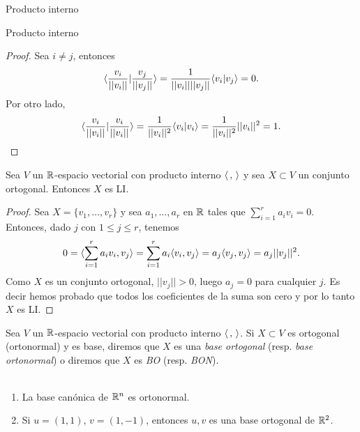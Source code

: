 \begin{chapter}{Producto interno}
\begin{section}{Producto interno}
\begin{proof}
            Sea $i \ne j$, entonces
            \begin{equation*}
            \langle \frac{v_i}{||v_i||} | \frac{v_j}{||v_j||}\rangle = \frac{1}{||v_i||||v_j||} \langle v_i | v_j\rangle = 0.
            \end{equation*}
            Por otro lado,
            \begin{equation*}
            \langle \frac{v_i}{||v_i||} | \frac{v_i}{||v_i||}\rangle = \frac{1}{||v_i||^2} \langle v_i | v_i\rangle=  \frac{1}{||v_i||^2}||v_i||^2 =1.
            \end{equation*}
        \end{proof}	
            
            
            
        
        
        \medskip
        
        \begin{teorema}\label{th-ortogonal-implica-li} Sea $V$  un $\mathbb R$-espacio vectorial con producto interno $\langle \,,\,\rangle$ y sea $X \subset V$ un conjunto  ortogonal. Entonces $X$ es LI. 
        \end{teorema}
        \begin{proof} Sea $X =\{v_1,\ldots,v_r \}$ y sea $a_1,\ldots,a_r$ en $\mathbb R$ tales que  $\sum_{i=1}^r a_iv_i =0$. Entonces,  dado $j$ con $1 \le j \le r$,  tenemos 
            $$
            0=\langle\sum_{i=1}^r a_iv_i ,v_j \rangle = \sum_{i=1}^r a_i\langle v_i ,v_j \rangle = a_j\langle v_j ,v_j \rangle = a_j||v_j||^2.
            $$
            Como $X$  es un conjunto ortogonal,  $||v_j|| >0$, luego $a_j =0$ para cualquier $j$. Es decir hemos probado que todos los coeficientes de la suma son cero y por lo tanto $X$  es LI.
        \end{proof}
        

        
        \begin{definicion} Sea $V$  un $\mathbb R$-espacio vectorial con producto interno $\langle \,,\,\rangle$. Si $X \subset V$ es ortogonal (ortonormal) y es base, diremos que $X$ es una \textit{base ortogonal} (resp. \textit{base ortonormal}) o diremos que $X$ es \textit{BO} (resp. \textit{BON}).
        \end{definicion}
        
        \begin{ejemplo*} ${}^{}$
            \begin{enumerate}
                \item La base canónica de $\mathbb R^n$ es ortonormal. 
                \item Si $u=(1,1)$, $v=(1,-1)$, entonces $u,v$ es una base ortogonal de $\mathbb R^2$.  
            \end{enumerate}
        \end{ejemplo*}
        

\end{section}
\end{chapter}
